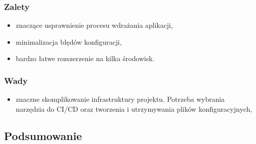 \documentclass{article}
\begin{document}
\subsubsection{Zalety}

\begin{itemize}
    \item znaczące usprawnienie procesu wdrażania aplikacji,
    \item minimalizacja błędów konfiguracji,
    \item bardzo łatwe rozszerzenie na kilka środowisk.
\end{itemize}

\subsubsection{Wady}

\begin{itemize}
    \item znaczne skomplikowanie infrastruktury projektu. Potrzeba wybrania narzędzia do CI/CD oraz tworzenia i utrzymywania plików konfiguracyjnych,
\end{itemize}

\subsection{Podsumowanie}
\end{document}
